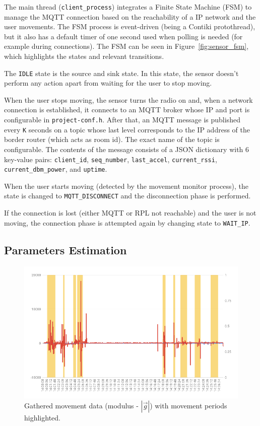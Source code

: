 \documentclass[a4paper, 10pt]{article}
\begin{document}
The main thread (\texttt{client\_process}) integrates a Finite State Machine (FSM) to manage the MQTT connection based on the reachability of a IP network and the user movements.
The FSM process is event-driven (being a Contiki protothread), but it also has a default timer of one second used when polling is needed (for example during connections).
The FSM can be seen in Figure~\ref{fig:sensor_fsm}, which highlights the states and relevant transitions.

The \texttt{IDLE} state is the source and sink state. In this state, the sensor doesn't perform any action apart from waiting for the user to stop moving.

When the user stops moving, the sensor turns the radio on and, when a network connection is established, it connects to an MQTT broker whose IP and port is configurable in \texttt{project-conf.h}.
After that, an MQTT message is published every \texttt{K} seconds on a topic whose last level corresponds to the IP address of the border router (which acts as room id). The exact name of the topic is configurable.
The contents of the message consists of a JSON dictionary with 6 key-value pairs: \texttt{client\_id}, \texttt{seq\_number}, \texttt{last\_accel}, \texttt{current\_rssi}, \texttt{current\_dbm\_power}, and \texttt{uptime}.

When the user starts moving (detected by the movement monitor process), the state is changed to \texttt{MQTT\_DISCONNECT} and the disconnection phase is performed.

If the connection is lost (either MQTT or RPL not reachable) and the user is not moving, the connection phase is attempted again by changing state to \texttt{WAIT\_IP}.

\subsection*{Parameters Estimation}

\begin{figure}[h]
\centering
    \includegraphics[width=0.7\linewidth]{images/accel_chart.png}
    \caption{Gathered movement data (modulus - $|\vec{g}|$) with movement periods highlighted.}
    \label{fig:accel_data}
\end{figure}
\end{document}

